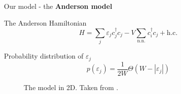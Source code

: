 \documentclass[1pt]{beamer}
\begin{document}
\begin{frame}{Our model - the \textbf{Anderson model}}
\begin{alertblock}{The Anderson Hamiltonian \cite{Anderson}}
\begin{equation*}\label{eq:ising_hamiltonian}
H=\sum\limits_j \varepsilon_j c^\dagger_jc_j - V\sum\limits_{\text{n.n.}} c^\dagger_{i}c_j + \text{h.c.}
\end{equation*}
\end{alertblock}{}
\begin{minipage}[c]{0.48\textwidth}
\begin{alertblock}{Probability distribution of $\varepsilon_j$}
\begin{equation*}\label{eq:ising_hamiltonian}
p(\varepsilon_j)=\frac{1}{2W}\Theta(W-|\varepsilon_j|)
\end{equation*}
\end{alertblock}{}
\begin{figure}
\end{figure}
\end{minipage}\hfill
\begin{minipage}[c]{0.45\textwidth}
\begin{figure}
\caption{The model in 2D. Taken from \cite{50yearsof}.}
\end{figure}
\end{minipage}\hfill
\end{frame}
\end{document}
